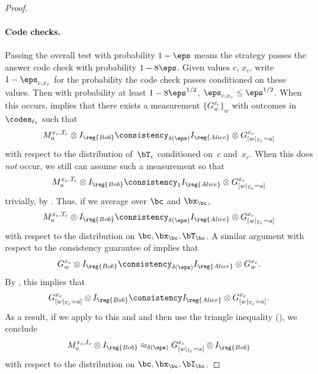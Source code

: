 \begin{proof}
\paragraph{Code checks.}
Passing the overall test with probability $1-\eps$
means the strategy passes the answer code check with probability $1-8\eps$.
Given values $c $, $x_{c}$, write $1-\eps_{c, x_{c}}$ for the probability the code check passes conditioned on these values.
Then with probability at least $1-8\eps^{1/2}$, $\eps_{c, x_{c}} \leq \eps^{1/2}$.
When this occurs,  implies that there exists a measurement $\{G^{x_c}_w\}_w$ with outcomes in $\codes_{\ell_1}$ such that
\begin{equation*}
M^{x_c, T_c}_a \otimes I_{\reg{Bob}}\consistency_{\delta(\eps)} I_{\reg{Alice}} \otimes G^{x_c}_{[w|_{T_c} = a]}
\end{equation*}
with respect to the distribution of~$\bT_c$ conditioned on~$c$ and~${x}_{c}$.
When this does \emph{not} occur, we still can assume such a measurement so that
\begin{equation*}
M^{x_c, T_c}_a \otimes I_{\reg{Bob}}\consistency_{1} I_{\reg{Alice}} \otimes G^{x_c}_{[w|_{T_c} = a]}
\end{equation*}
trivially, by . Thus, if we average over $\bc$ and $\bx_{\bc}$,
\begin{equation}\label{eq:almost-at-tweedledee}
M^{x_c, T_c}_a \otimes I_{\reg{Bob}}\consistency_{\delta(\eps)} I_{\reg{Alice}} \otimes G^{x_c}_{[w|_{T_c} = a]}
\end{equation}
with respect to the distribution on $\bc, \bx_{\bc}, \bT_{\bc}$.
A similar argument with respect to the consistency guarantee of  implies that
\begin{equation}\label{eq:consistency-of-the-encoding}
G^{x_c}_w \otimes I_{\reg{Bob}} \consistency_{\delta(\eps)} I_{\reg{Alice}} \otimes G^{x_c}_w.
\end{equation}
By , this implies that
\begin{equation*}
G^{x_c}_{[w|_{T_c} = a]} \otimes I_{\reg{Bob}} \consistency I_{\reg{Alice}} \otimes G^{x_c}_{[w|_{T_c} = a]}.
\end{equation*}
As a result, if we apply  to this and  and then use the triangle inequality (), we conclude
\begin{equation}\label{eq:tweedledee}
M^{x_c, I_c}_a \otimes I_{\reg{Bob}}\approx_{\delta(\eps)}G^{x_c}_{[w|_{I_c} = a]} \otimes  I_{\reg{Bob}}
\end{equation}
with respect to the distribution on $\bc, \bx_{\bc}, \bI_{\bc}$.


\end{proof}
